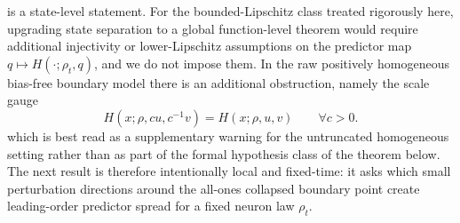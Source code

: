 \documentclass[11pt]{article}
\theoremstyle{definition}
\begin{document}
 is a state-level statement. For the bounded-Lipschitz
class treated rigorously here, upgrading state separation to a global
function-level theorem would require additional injectivity or lower-Lipschitz
assumptions on the predictor map $q\mapsto H(\cdot;\rho_t,q)$, and we do not
impose them. In the raw positively homogeneous bias-free boundary model there
is an additional obstruction, namely the scale gauge
\[
  H(x;\rho,cu,c^{-1}v)=H(x;\rho,u,v)
  \qquad
  \forall c>0.
\]
which is best read as a supplementary warning for the untruncated homogeneous
setting rather than as part of the formal hypothesis class of the theorem
below. The next result is therefore intentionally local and fixed-time: it
asks which small perturbation directions around the all-ones collapsed boundary
point create leading-order predictor spread for a fixed neuron law $\rho_t$.
\end{document}
